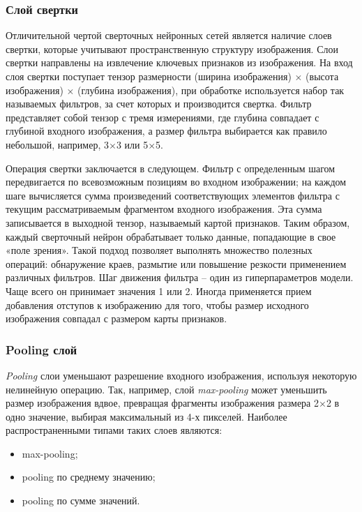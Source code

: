 \subsubsection{Слой свертки}
Отличительной чертой сверточных нейронных сетей является наличие слоев свертки, которые учитывают пространственную структуру изображения. Слои свертки направлены на извлечение ключевых признаков из изображения. На вход слоя свертки поступает тензор размерности (ширина изображения) $\times$ (высота изображения) $\times$ (глубина изображения), при обработке используется набор так называемых фильтров, за счет которых и производится свертка. Фильтр представляет собой тензор с тремя измерениями, где глубина совпадает с глубиной входного изображения, а размер фильтра выбирается как правило небольшой, например, 3$\times$3 или 5$\times$5.

Операция свертки заключается в следующем. Фильтр с определенным шагом передвигается по всевозможным позициям во входном изображении; на каждом шаге вычисляется сумма произведений соответствующих элементов фильтра с текущим рассматриваемым фрагментом входного изображения. Эта сумма записывается в выходной тензор, называемый картой признаков.
Таким образом, каждый сверточный нейрон обрабатывает только данные, попадающие в свое «поле зрения». Такой подход позволяет выполнять множество полезных операций: обнаружение краев, размытие или повышение резкости применением различных фильтров.
Шаг движения фильтра – один из гиперпараметров модели. Чаще всего он принимает значения 1 или 2.
Иногда применяется прием добавления отступов к изображению для того, чтобы размер исходного изображения совпадал с размером карты признаков.

\subsubsection{Pooling слой}
\emph{Pooling} слои уменьшают разрешение входного изображения, используя некоторую нелинейную операцию. Так, например, слой \emph{max-pooling} может уменьшить размер изображения вдвое, превращая фрагменты изображения размера 2$\times$2 в одно значение, выбирая максимальный из 4-х пикселей. Наиболее распространенными типами таких слоев являются:
\begin{itemize}
	\item max-pooling;
	\item pooling по среднему значению;
	\item pooling по сумме значений.
\end{itemize}

